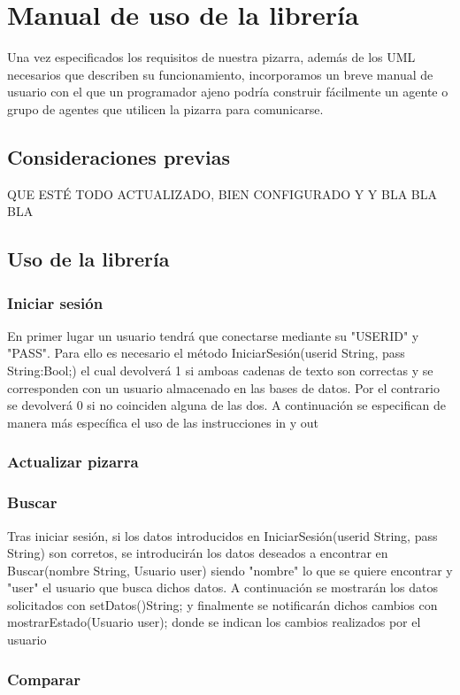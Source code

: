 \chapter{Manual de uso de la librería}
Una vez especificados los requisitos de nuestra pizarra, además de los UML necesarios que describen su funcionamiento, incorporamos un breve manual de usuario con el que un programador ajeno podría construir fácilmente un agente o grupo de agentes que utilicen la pizarra para comunicarse.

\section{Consideraciones previas}
\color{red}QUE ESTÉ TODO ACTUALIZADO, BIEN CONFIGURADO Y Y BLA BLA BLA
\color{black}
\section{Uso de la librería}
\subsection{Iniciar sesión}
En primer lugar un usuario tendrá que conectarse mediante su "USERID" y "PASS". Para ello es necesario el método IniciarSesión(userid String, pass String:Bool;) el cual devolverá 1 si amboas cadenas de texto son correctas y se corresponden con un usuario almacenado en las bases de datos. Por el contrario se devolverá 0 si no coinciden alguna de las dos.
A continuación se especifican de manera más específica el uso de las instrucciones in y out
\subsection{Actualizar pizarra}
\subsection{Buscar}
Tras iniciar sesión, si los datos introducidos en IniciarSesión(userid String, pass String) son corretos, se introducirán los datos deseados a encontrar en Buscar(nombre String, Usuario user) siendo "nombre" lo que se quiere encontrar y "user" el usuario que busca dichos datos. A continuación se mostrarán los datos solicitados con setDatos()String; y finalmente se notificarán dichos cambios con mostrarEstado(Usuario user); donde se indican los cambios realizados por el usuario
\subsection{Comparar}

